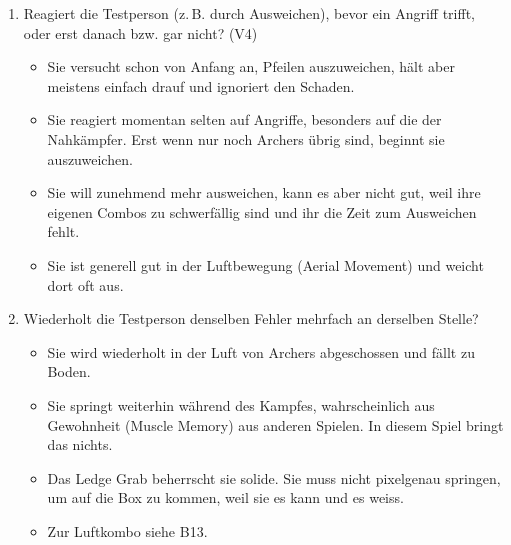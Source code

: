 \documentclass[../Main.tex]{subfiles}
\begin{document}
\begin{enumerate}[label=\textbf{B\arabic*}, leftmargin=1.5cm, itemsep=0.8em]
\item Reagiert die Testperson (z.\,B. durch Ausweichen), bevor ein Angriff trifft, oder erst danach bzw. gar nicht? \hfill (V4)
    \begin{itemize}[nosep]
        \item Sie versucht schon von Anfang an, Pfeilen auszuweichen, hält aber meistens einfach drauf und ignoriert den Schaden.
        \item Sie reagiert momentan selten auf Angriffe, besonders auf die der Nahkämpfer. Erst wenn nur noch Archers übrig sind, beginnt sie auszuweichen.
        \item Sie will zunehmend mehr ausweichen, kann es aber nicht gut, weil ihre eigenen Combos zu schwerfällig sind und ihr die Zeit zum Ausweichen fehlt.
        \item Sie ist generell gut in der Luftbewegung (Aerial Movement) und weicht dort oft aus.
    \end{itemize}

\item Wiederholt die Testperson denselben Fehler mehrfach an derselben Stelle?
    \begin{itemize}[nosep]
        \item Sie wird wiederholt in der Luft von Archers abgeschossen und fällt zu Boden.
        \item Sie springt weiterhin während des Kampfes, wahrscheinlich aus Gewohnheit (Muscle Memory) aus anderen Spielen. In diesem Spiel bringt das nichts.
        \item Das Ledge Grab beherrscht sie solide. Sie muss nicht pixelgenau springen, um auf die Box zu kommen, weil sie es kann und es weiss.
        \item Zur Luftkombo siehe B13.
    \end{itemize}
\end{enumerate}
\end{document}
